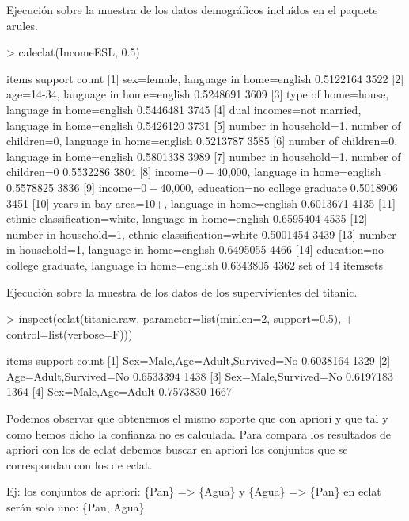 \documentclass [a4paper] {article}
\begin{document}
Ejecución sobre la muestra de los datos demográficos incluídos en el paquete arules.
\begin{Schunk}
\begin{Sinput}
> caleclat(IncomeESL, 0.5)
\end{Sinput}
\begin{Soutput}
     items                             support count
[1]  {sex=female,                                   
      language in home=english}      0.5122164  3522
[2]  {age=14-34,                                    
      language in home=english}      0.5248691  3609
[3]  {type of home=house,                           
      language in home=english}      0.5446481  3745
[4]  {dual incomes=not married,                     
      language in home=english}      0.5426120  3731
[5]  {number in household=1,                        
      number of children=0,                         
      language in home=english}      0.5213787  3585
[6]  {number of children=0,                         
      language in home=english}      0.5801338  3989
[7]  {number in household=1,                        
      number of children=0}          0.5532286  3804
[8]  {income=$0-$40,000,                            
      language in home=english}      0.5578825  3836
[9]  {income=$0-$40,000,                            
      education=no college graduate} 0.5018906  3451
[10] {years in bay area=10+,                        
      language in home=english}      0.6013671  4135
[11] {ethnic classification=white,                  
      language in home=english}      0.6595404  4535
[12] {number in household=1,                        
      ethnic classification=white}   0.5001454  3439
[13] {number in household=1,                        
      language in home=english}      0.6495055  4466
[14] {education=no college graduate,                
      language in home=english}      0.6343805  4362
set of 14 itemsets 
\end{Soutput}
\end{Schunk}

Ejecución sobre la muestra de los datos de los supervivientes del titanic.
\begin{Schunk}
\begin{Sinput}
> inspect(eclat(titanic.raw, parameter=list(minlen=2, support=0.5),
+                            control=list(verbose=F)))
\end{Sinput}
\begin{Soutput}
    items                            support   count
[1] {Sex=Male,Age=Adult,Survived=No} 0.6038164 1329 
[2] {Age=Adult,Survived=No}          0.6533394 1438 
[3] {Sex=Male,Survived=No}           0.6197183 1364 
[4] {Sex=Male,Age=Adult}             0.7573830 1667 
\end{Soutput}
\end{Schunk}

Podemos observar que obtenemos el mismo soporte que con apriori y que tal y como hemos dicho la confianza no es calculada.
Para compara los resultados de apriori con los de eclat debemos buscar en apriori los conjuntos que se correspondan con los de eclat.

Ej: los conjuntos de apriori: \{Pan\} => \{Agua\} y \{Agua\} => \{Pan\} en eclat serán solo uno: \{Pan, Agua\}
\end{document}

